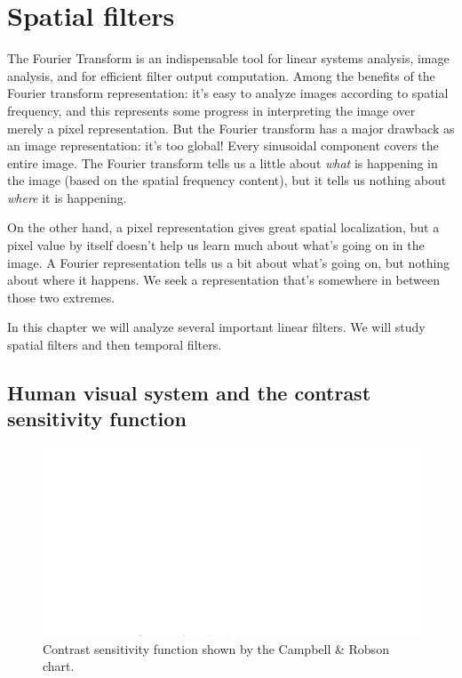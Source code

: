 
\chapter{Spatial filters}

The Fourier Transform is an indispensable tool for linear systems analysis,
image analysis, and for efficient filter output computation.  
Among the benefits of the Fourier transform representation:  it's easy
to analyze images according to spatial frequency, and this represents some
progress in interpreting the image over merely a
pixel representation.  But the Fourier transform has a major drawback
as an image representation: it's too global!  Every sinusoidal
component covers the entire image.  The Fourier transform tells us a
little about {\em what} is happening in the image (based on the spatial
frequency content), but it tells us nothing about {\em where} it is happening.  

On the other hand, a pixel representation gives great spatial localization, but a pixel
value by itself doesn't help us learn much about what's going on in
the image.  A Fourier representation tells us a bit about what's going
on, but nothing about where it happens.  We seek a representation
that's somewhere in between those two extremes.



In this chapter we will analyze several important linear filters. We will study spatial filters and then temporal filters.



\section{Human visual system and the contrast sensitivity function}

\begin{figure}
\centerline{
\includegraphics[width=1\linewidth]{figures/spatial_filters/csf.png}
} 
\caption{Contrast sensitivity function shown by the Campbell \& Robson chart.} 
\label{fig:csfchart}
\end{figure}


